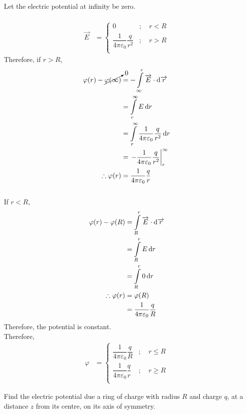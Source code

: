 \documentclass[fleqn, a4paper, 12pt, twoside]{article}
\theoremstyle{definition}
\theoremstyle{theorem}
\begin{document}
\begin{solution}
	Let the electric potential at infinity be zero.\\
	~\\
	\begin{align*}
		\overrightarrow{E} &=
			\begin{cases}
				0 &;\quad r < R\\
				\dfrac{1}{4 \pi \varepsilon_0} \dfrac{q}{r^2} &;\quad r > R\\
			\end{cases}
	\end{align*}
	Therefore, if $r > R$,
	\begin{align*}
		\varphi(r) - \cancelto{0}{\varphi(\infty)} &= - \int\limits_{\infty}^{r} \overrightarrow{E} \cdot \dif \overrightarrow{r}\\
		&= \int\limits_{r}^{\infty} E \dif r\\
		&= \int\limits_{r}^{\infty} \dfrac{1}{4 \pi \varepsilon_0} \dfrac{q}{r^2} \dif r\\
		&= \left. - \dfrac{1}{4 \pi \varepsilon_0} \dfrac{q}{r^2} \right|_{r}^{\infty}\\
		\therefore \varphi(r) &= \dfrac{1}{4 \pi \varepsilon_0} \dfrac{q}{r}
	\end{align*}
	~\\
	If $r < R$,
	\begin{align*}
		\varphi(r) - \varphi(R) &= \int\limits_{R}^{r} \overrightarrow{E} \cdot \dif \overrightarrow{r}\\
		&= \int\limits_{R}^{r} E \dif r\\
		&= \int\limits_{R}^{r} 0 \dif r\\
		\therefore \varphi(r) &= \varphi(R)\\
		&= \dfrac{1}{4 \pi \varepsilon_0} \dfrac{q}{R}
	\end{align*}
	Therefore, the potential is constant.
	~\\
	Therefore,
	\begin{align*}
		\varphi &=
			\begin{cases}
				\dfrac{1}{4 \pi \varepsilon_0} \dfrac{q}{R} &;\quad r \le R\\
				\dfrac{1}{4 \pi \varepsilon_0} \dfrac{q}{r} &;\quad r \ge R\\
			\end{cases}
	\end{align*}
\end{solution}

\begin{question}
	Find the electric potential due a ring of charge with radius $R$ and charge $q$, at a distance $z$ from its centre, on its axis of symmetry.
\end{question}
\end{document}
